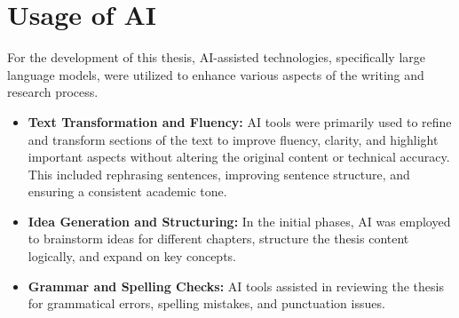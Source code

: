 \chapter{Usage of AI}

For the development of this thesis, AI-assisted technologies, specifically large language models, were utilized to enhance various aspects of the writing and research process.

\begin{itemize}
    \item \textbf{Text Transformation and Fluency:} AI tools were primarily used to refine and transform sections of the text to improve fluency, clarity, and highlight important aspects without altering the original content or technical accuracy. This included rephrasing sentences, improving sentence structure, and ensuring a consistent academic tone.
    \item \textbf{Idea Generation and Structuring:} In the initial phases, AI was employed to brainstorm ideas for different chapters, structure the thesis content logically, and expand on key concepts.
    \item \textbf{Grammar and Spelling Checks:} AI tools assisted in reviewing the thesis for grammatical errors, spelling mistakes, and punctuation issues.
\end{itemize}
